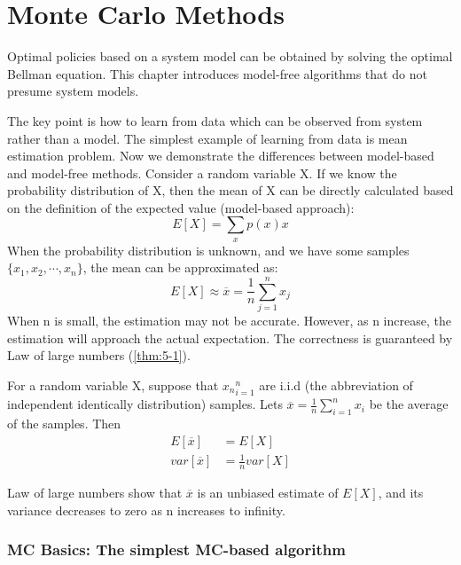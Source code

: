 \part{Monte Carlo Methods} Optimal policies based on a system model can be obtained by solving the optimal Bellman equation. This chapter introduces
model-free algorithms that do not presume system models. \par The key point is how to learn from data which can be observed from system rather than a model.
The simplest example of learning from data is mean estimation problem. Now we demonstrate the differences between model-based and model-free methods.
Consider a random variable X. If we know the probability distribution of X, then the mean of X can be directly calculated based on the definition of the
expected value (model-based approach):
\begin{equation*}
  E[X] = \sum_{x}p(x)x
\end{equation*}
When the probability distribution is unknown, and we have some samples $\{x_{1},x_{2},\cdots,x_{n}\}$, the mean can be approximated as:
\begin{equation}
  \label{form:5-1}
  E[X] \approx \overline{x} =\frac{1}{n}\sum_{j=1}^{n}x_{j}
\end{equation}
When n is small, the estimation may not be accurate. However, as n increase, the estimation will approach the actual expectation. The correctness is
guaranteed by Law of large numbers (\ref{thm:5-1}).
\begin{theorem}
  \label{thm:5-1}
  For a random variable X, suppose that ${x_{n}}^{n}_{i=1}$ are i.i.d (the abbreviation of independent identically distribution) samples. Lets
  $\overline{x}=\frac{1}{n}\sum_{i=1}^{n} x_{i}$ be the average of the samples. Then
  \begin{align*}
    E[\overline{x}]   & = E[X]              \\
    var[\overline{x}] & = \frac{1}{n}var[X]
  \end{align*}
\end{theorem}
Law of large numbers show that $\overline{x}$ is an unbiased estimate of $E[X]$, and its variance decreases to zero as n increases to infinity. \par

\section{MC Basics: The simplest MC-based algorithm}

